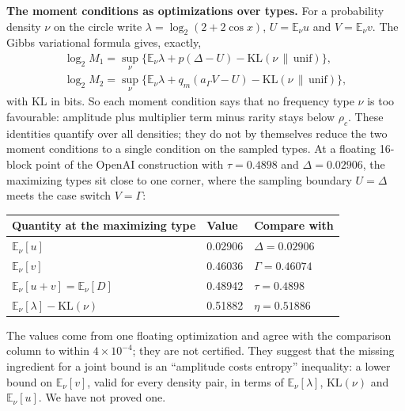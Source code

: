 \documentclass[11pt]{article}
\newcommand{\E}{\mathbb{E}}
\newcommand{\KL}{\mathrm{KL}}
\theoremstyle{plain}
\begin{document}
\textbf{The moment conditions as optimizations over types.} For a probability density $\nu$ on the circle write $\lambda = \log_2(2+2\cos x)$, $U = \E_\nu u$ and $V = \E_\nu v$. The Gibbs variational formula gives, exactly,
\begin{gather*}
\log_2 M_1 = \sup_\nu \bigl\{\E_\nu \lambda + p(\Delta - U) - \KL(\nu \,\|\, \mathrm{unif})\bigr\}, \\
\log_2 M_2 = \sup_\nu \bigl\{\E_\nu \lambda + q_m(a_\Gamma V - U) - \KL(\nu \,\|\, \mathrm{unif})\bigr\},
\end{gather*}
with $\KL$ in bits. So each moment condition says that no frequency type $\nu$ is too favourable: amplitude plus multiplier term minus rarity stays below $\rho_c$. These identities quantify over all densities; they do not by themselves reduce the two moment conditions to a single condition on the sampled types. At a floating 16-block point of the OpenAI construction with $\tau = 0.4898$ and $\Delta = 0.02906$, the maximizing types sit close to one corner, where the sampling boundary $U = \Delta$ meets the case switch $V = \Gamma$:

\begin{center}
\small
\begin{tabular}{lll}
\toprule
Quantity at the maximizing type & Value & Compare with \\
\midrule
$\E_\nu[u]$ & 0.02906 & $\Delta = 0.02906$ \\
$\E_\nu[v]$ & 0.46036 & $\Gamma = 0.46074$ \\
$\E_\nu[u + v] = \E_\nu[D]$ & 0.48942 & $\tau = 0.4898$ \\
$\E_\nu[\lambda] - \KL(\nu)$ & 0.51882 & $\eta = 0.51886$ \\
\bottomrule
\end{tabular}
\end{center}

The values come from one floating optimization and agree with the comparison column to within $4\times10^{-4}$; they are not certified. They suggest that the missing ingredient for a joint bound is an ``amplitude costs entropy'' inequality: a lower bound on $\E_\nu[v]$, valid for every density pair, in terms of $\E_\nu[\lambda]$, $\KL(\nu)$ and $\E_\nu[u]$. We have not proved one.
\end{document}
